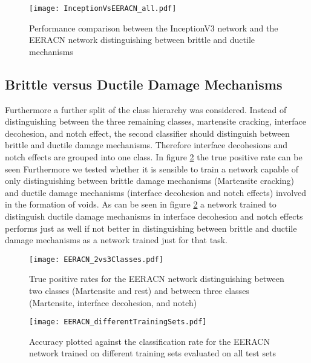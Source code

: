 \begin{figure}
  \texttt{[image: InceptionVsEERACN\_all.pdf]}
\caption{Performance comparison between the InceptionV3 network and the EERACN network distinguishing between brittle and ductile mechanisms}
\label{fig:InVsEE}
\end{figure}


\subsection{Brittle versus Ductile Damage Mechanisms}
Furthermore a further split of the class hierarchy was considered. Instead of distinguishing between the three remaining classes, martensite cracking, interface decohesion, and notch effect, the second classifier should distinguish between brittle and ductile damage mechanisms. Therefore interface decohesions and notch effects are grouped into one class. In figure \ref{fig:2vs3Classes} the true positive rate can be seen 
Furthermore we tested whether it is sensible to train a network capable of only distinguishing between brittle damage mechanisms (Martensite cracking) and ductile damage mechanisms (interface decohesion and notch effects) involved in the formation of voids. As can be seen in figure \ref{fig:2vs3Classes} a network trained to distinguish ductile damage mechanisms in interface decohesion and notch effects performs just as well if not better in distinguishing between brittle and ductile damage mechanisms as a network trained just for that task.

\begin{figure}
  \texttt{[image: EERACN\_2vs3Classes.pdf]}
\caption{True positive rates for the EERACN network distinguishing between two classes (Martensite and rest) and between three classes (Martensite, interface decohesion, and notch)}
\label{fig:2vs3Classes}
\end{figure}

\begin{figure}
  \texttt{[image: EERACN\_differentTrainingSets.pdf]}
\caption{Accuracy plotted against the classification rate for the EERACN network trained on different training sets evaluated on all test sets}
\label{fig:TPR_comparison}
\end{figure}

